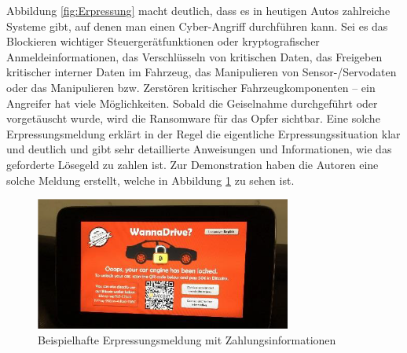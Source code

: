 \newpage
Abbildung \ref{fig:Erpressung} macht deutlich, dass es in heutigen Autos zahlreiche Systeme gibt, 
auf denen man einen Cyber-Angriff durchführen kann. Sei es das Blockieren wichtiger 
Steuergerätfunktionen oder kryptografischer Anmeldeinformationen, das Verschlüsseln 
von kritischen Daten, das Freigeben kritischer interner Daten im Fahrzeug, das 
Manipulieren von Sensor-/Servodaten oder das Manipulieren bzw. Zerstören kritischer 
Fahrzeugkomponenten – ein Angreifer hat viele Möglichkeiten. 
\newline
Sobald die Geiselnahme durchgeführt oder vorgetäuscht wurde, wird die Ransomware 
für das Opfer sichtbar. Eine solche Erpressungsmeldung erklärt in der Regel die eigentliche 
Erpressungssituation klar und deutlich und gibt sehr detaillierte Anweisungen und Informationen, 
wie das geforderte Lösegeld zu zahlen ist. Zur Demonstration haben die Autoren eine 
solche Meldung erstellt, welche in Abbildung \ref{fig:WannaDrive} zu sehen ist. 
\newline

\begin{figure}[htbp!]
    \centering
    \includegraphics[width=0.75\textwidth]{Images/WannaDrive.png}
    \caption{Beispielhafte Erpressungsmeldung mit Zahlungsinformationen
    \cite{M.Wolf.2017}}
    \label{fig:WannaDrive}
\end{figure}
